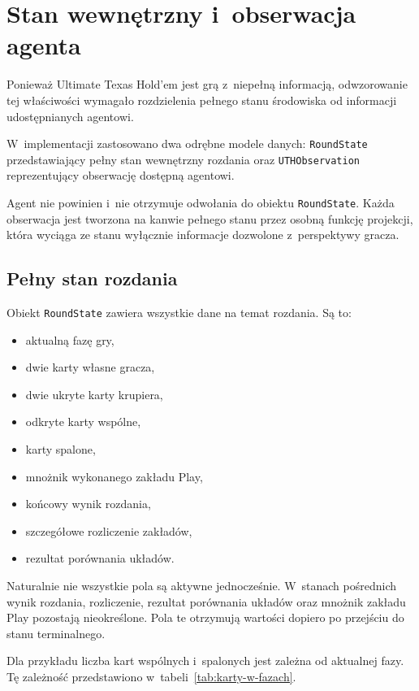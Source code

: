 \section{Stan wewnętrzny i~obserwacja agenta}
\label{sec:stan-i-obserwacja}

Ponieważ Ultimate Texas Hold’em jest grą z~niepełną informacją, odwzorowanie tej
właściwości wymagało rozdzielenia pełnego stanu środowiska od informacji
udostępnianych agentowi.

W~implementacji zastosowano dwa odrębne modele danych: \texttt{RoundState}
przedstawiający pełny stan wewnętrzny rozdania oraz \texttt{UTHObservation}
reprezentujący obserwację dostępną agentowi.

Agent nie powinien i~nie otrzymuje odwołania do obiektu
\texttt{RoundState}. Każda obserwacja jest tworzona na kanwie pełnego stanu przez
osobną funkcję projekcji, która wyciąga ze stanu wyłącznie informacje dozwolone
z~perspektywy gracza.

\subsection{Pełny stan rozdania}
\label{subsec:round-state}

Obiekt \texttt{RoundState} zawiera wszystkie dane na temat rozdania. Są to:

\begin{itemize}
    \item aktualną fazę gry,
    \item dwie karty własne gracza,
    \item dwie ukryte karty krupiera,
    \item odkryte karty wspólne,
    \item karty spalone,
    \item mnożnik wykonanego zakładu Play,
    \item końcowy wynik rozdania,
    \item szczegółowe rozliczenie zakładów,
    \item rezultat porównania układów.
\end{itemize}

Naturalnie nie wszystkie pola są aktywne jednocześnie. W~stanach pośrednich wynik
rozdania, rozliczenie, rezultat porównania układów oraz mnożnik zakładu Play pozostają
nieokreślone. Pola te otrzymują wartości dopiero po przejściu do stanu
terminalnego.

Dla przykładu liczba kart wspólnych i~spalonych jest zależna od aktualnej fazy.
Tę zależność przedstawiono w~tabeli~\ref{tab:karty-w-fazach}.


